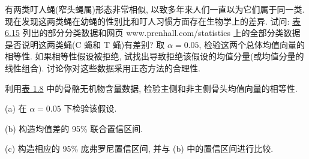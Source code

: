\quad 有两类叮人蝇(窄头蝇属)形态非常相似, 以致多年来人们一直以为它们属于同一类. 现在发现这两类蝇在幼蝇的性别比和叮人习惯方面存在生物学上的差异. 试问: \hyperref[tab:6.15]{表 6.15} 列出的部分分类数据和网页 www.prenhall.com/statistics 上的全部分类数据是否说明这两类蝇(C 蝇和 T 蝇)有差别? 取 $\alpha=0.05$, 检验这两个总体均值向量的相等性. 如果相等性假设被拒绝, 试找出导致拒绝该假设的均值分量(或均值分量的线性组合). 讨论你对这些数据采用正态方法的合理性.

\quad 利用\hyperref[tab:1.8]{表 1.8} 中的骨骼无机物含量数据, 检验主侧和非主侧骨头均值向量的相等性.

\noindent (a) 在 $\alpha=0.05$ 下检验该假设.

\noindent (b) 构造均值差的 95\% 联合置信区间.

\noindent (c) 构造相应的 95\% 庞弗罗尼置信区间, 并与 (b) 中的置信区间进行比较.
